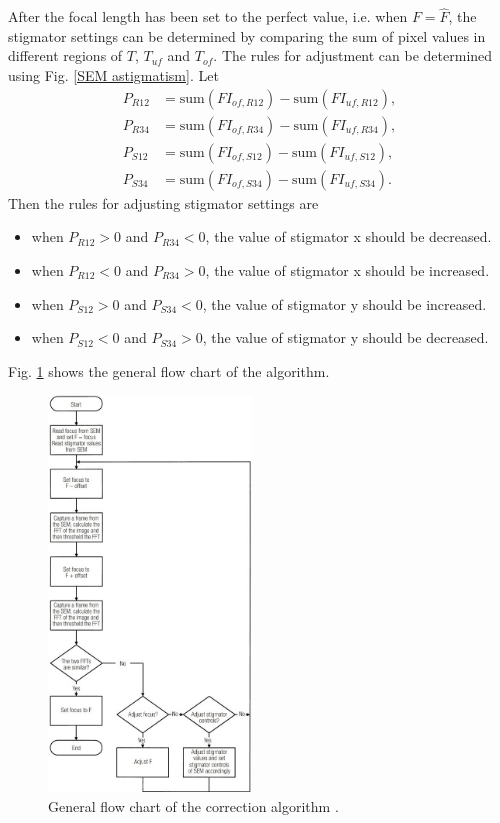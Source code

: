 \documentclass[12pt, conference]{IEEEtran}
\begin{document}
After the focal length has been set to the perfect value, i.e. when $F=\hat{F}$, the stigmator settings can be determined by comparing the sum of pixel values in different regions of $T$, $T_{uf}$ and $T_{of}$. The rules for adjustment can be determined using Fig. \ref{SEM astigmatism}. Let
\begin{align}
    P_{R12} & = \text{sum}(FI_{of,R12}) - \text{sum}(FI_{uf,R12}), \\
    P_{R34} & = \text{sum}(FI_{of,R34}) - \text{sum}(FI_{uf,R34}), \\
    P_{S12} & = \text{sum}(FI_{of,S12}) - \text{sum}(FI_{uf,S12}), \\
    P_{S34} & = \text{sum}(FI_{of,S34}) - \text{sum}(FI_{uf,S34}).
\end{align}
Then the rules for adjusting stigmator settings are
\begin{itemize}
    \item when $P_{R12}>0$ and $P_{R34}<0$, the value of stigmator x should be decreased.
    \item when $P_{R12}<0$ and $P_{R34}>0$, the value of stigmator x should be increased.
    \item when $P_{S12}>0$ and $P_{S34}<0$, the value of stigmator y should be increased.
    \item when $P_{S12}<0$ and $P_{S34}>0$, the value of stigmator y should be decreased.
\end{itemize}

Fig. \ref{Correction algorithm flowchart} shows the general flow chart of the algorithm.

\begin{figure}[htbp]
    \centering
    \includegraphics[width=0.48\textwidth]{Images/Correction algorithm flowchart.jpg}
    \caption{General flow chart of the correction algorithm \cite{SEM correction algorithm}.}
    \label{Correction algorithm flowchart}
\end{figure}
\end{document}
